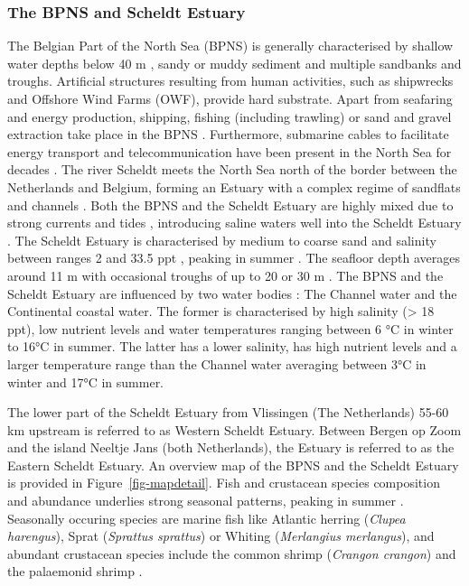 \documentclass[
  authoryear,
  review,
  3p]{elsarticle}
\begin{document}
\hypertarget{sec-mmscheldtBPNS}{%
\subsubsection{The BPNS and Scheldt Estuary}\label{sec-mmscheldtBPNS}}

The Belgian Part of the North Sea (BPNS) is generally characterised by
shallow water depths below 40 m \citep{thierry_2019}, sandy or muddy
sediment \citep{wolff_1973, vasquez_2021} and multiple sandbanks and
troughs. Artificial structures resulting from human activities, such as
shipwrecks and Offshore Wind Farms (OWF), provide hard substrate. Apart
from seafaring and energy production, shipping, fishing (including
trawling) or sand and gravel extraction take place in the BPNS
\citep{chen_2005, douvere_2007}. Furthermore, submarine cables to
facilitate energy transport and telecommunication have been present in
the North Sea for decades \citep{degroot_1979}. The river Scheldt meets
the North Sea north of the border between the Netherlands and Belgium,
forming an Estuary with a complex regime of sandflats and channels
\citep{claessens_1988}. Both the BPNS and the Scheldt Estuary are highly
mixed due to strong currents and tides \citep{otto_1990}, introducing
saline waters well into the Scheldt Estuary \citep{ouboter_1998}. The
Scheldt Estuary is characterised by medium to coarse sand and salinity
between ranges 2 and 33.5 ppt \citep{baeyens_1998}, peaking in summer
\citep{maes_1998}. The seafloor depth averages around 11 m with
occasional troughs of up to 20 or 30 m \citep{thierry_2019}. The BPNS
and the Scheldt Estuary are influenced by two water bodies
\citep{wolff_1973}: The Channel water and the Continental coastal water.
The former is characterised by high salinity (\textgreater{} 18 ppt),
low nutrient levels and water temperatures ranging between 6 °C in
winter to 16°C in summer. The latter has a lower salinity, has high
nutrient levels and a larger temperature range than the Channel water
averaging between 3°C in winter and 17°C in summer.

The lower part of the Scheldt Estuary from Vlissingen (The Netherlands)
55-60 km upstream is referred to as Western Scheldt
Estuary\citep{baeyens_1998, ouboter_1998}. Between Bergen op Zoom and
the island Neeltje Jans (both Netherlands), the Estuary is referred to
as the Eastern Scheldt Estuary. An overview map of the BPNS and the
Scheldt Estuary is provided in Figure~\ref{fig-mapdetail}. Fish and
crustacean species composition and abundance underlies strong seasonal
patterns, peaking in summer \citep{maes_1998, maes_2005}. Seasonally
occuring species are marine fish like Atlantic herring (\emph{Clupea
harengus}), Sprat (\emph{Sprattus sprattus}) or Whiting
(\emph{Merlangius merlangus}), and abundant crustacean species include
the common shrimp (\emph{Crangon crangon}) and the palaemonid shrimp
\citep[\emph{Palaemon varians},][]{maes_1998}.
\end{document}
